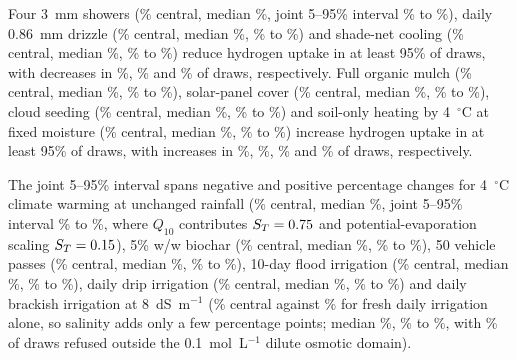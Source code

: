 \documentclass[11pt,a4paper]{article}
\begin{document}
Four 3~mm showers (\QRainFourRef\% central, median \QRainFourMedian\%, joint 5--95\% interval \QRainFourLow\% to \QRainFourHigh\%), daily 0.86~mm drizzle (\QRainDrizzleRef\% central, median \QRainDrizzleMedian\%, \QRainDrizzleLow\% to \QRainDrizzleHigh\%) and shade-net cooling (\QShadeFullRef\% central, median \QShadeFullMedian\%, \QShadeFullLow\% to \QShadeFullHigh\%) reduce hydrogen uptake in at least 95\% of draws, with decreases in \QRainFourPneg\%, \QRainDrizzlePneg\% and \QShadeFullPneg\% of draws, respectively. Full organic mulch (\QMulchFullRef\% central, median \QMulchFullMedian\%, \QMulchFullLow\% to \QMulchFullHigh\%), solar-panel cover (\QSolarFullRef\% central, median \QSolarFullMedian\%, \QSolarFullLow\% to \QSolarFullHigh\%), cloud seeding (\QCloudTenRef\% central, median \QCloudTenMedian\%, \QCloudTenLow\% to \QCloudTenHigh\%) and soil-only heating by 4~$^\circ$C at fixed moisture (\QHotterSoilFourRef\% central, median \QHotterSoilFourMedian\%, \QHotterSoilFourLow\% to \QHotterSoilFourHigh\%) increase hydrogen uptake in at least 95\% of draws, with increases in \QMulchFullPpos\%, \QSolarFullPpos\%, \QCloudTenPpos\% and \QHotterSoilFourPpos\% of draws, respectively.

The joint 5--95\% interval spans negative and positive percentage changes for 4~$^\circ$C climate warming at unchanged rainfall (\QHotterFourRef\% central, median \QHotterFourMedian\%, joint 5--95\% interval \QHotterFourLow\% to \QHotterFourHigh\%, where $Q_{10}$ contributes $S_T=0.75$ and potential-evaporation scaling $S_T=0.15$), 5\% w/w biochar (\QBiocharFiveRef\% central, median \QBiocharFiveMedian\%, \QBiocharFiveLow\% to \QBiocharFiveHigh\%), 50 vehicle passes (\QCompactionFiftyRef\% central, median \QCompactionFiftyMedian\%, \QCompactionFiftyLow\% to \QCompactionFiftyHigh\%), 10-day flood irrigation (\QDripTenDayRef\% central, median \QDripTenDayMedian\%, \QDripTenDayLow\% to \QDripTenDayHigh\%), daily drip irrigation (\QDripDailyRef\% central, median \QDripDailyMedian\%, \QDripDailyLow\% to \QDripDailyHigh\%) and daily brackish irrigation at 8~dS~m$^{-1}$ (\QSaltyEightRef\% central against \QSaltyFreshDailyRef\% for fresh daily irrigation alone, so salinity adds only a few percentage points; median \QSaltyEightMedian\%, \QSaltyEightLow\% to \QSaltyEightHigh\%, with \QSaltyEightRefusalPct\% of draws refused outside the 0.1~mol~L$^{-1}$ dilute osmotic domain).
\end{document}
